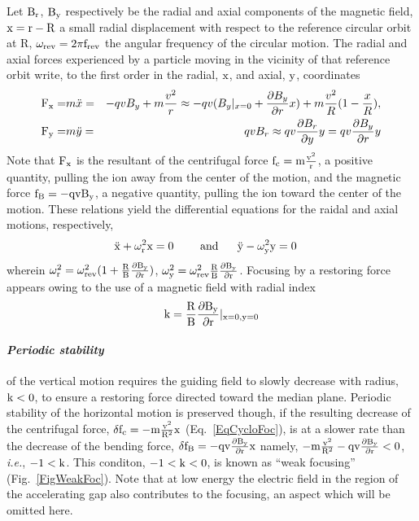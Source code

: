 Let $\rm B_r$, $\rm B_y$ respectively be the radial and axial components of the magnetic field, 
$\rm x=r-R$ a small radial displacement with respect to the reference circular orbit at R,  
$\rm \omega_{\rm rev} = 2\pi f_{\rm rev} $ the angular frequency of the circular motion. 
The radial and axial forces experienced by a particle moving in the vicinity of that reference orbit 
write, to the first order in the radial, $\rm x$,  and axial, $\rm y$, coordinates 
\begin{eqnarray}
\label{EqCycloFoc}
\rm
F_x = & m \ddot x=&  -qvB_y + m\frac{v^2}{r} \approx -q v (B_y|_{x=0} + \frac{\partial B_y}{\partial r}x)  + m\frac{v^2}{R}(1-\frac{x}{R}),   \nonumber \\ 
\rm 
F_y= & m\ddot y = &  qvB_r \approx q v \frac{\partial B_r}{\partial y} y = q v \frac{\partial B_y}{\partial r} y
\end{eqnarray}
Note that $\rm F_x$ is the resultant of the centrifugal force $\rm f_c=m\frac{v^2}{r}$, a positive quantity, pulling the ion 
away from the center of the motion, 
and the magnetic force $\rm f_B= -qvB_y$, a negative quantity, pulling the ion toward the center of the motion.
These relations yield the differential equations for the raidal and axial motions, respectively, 
\begin{eqnarray}
\label{EqCycloDiffEq}
\rm
  \ddot x + \omega_r^2 x=0 &  \ \ \ \ \ \ \ \rm and \ \ \ \ \
  \ddot{y} - \omega_y^2 y= 0  
\end{eqnarray}
wherein 
$\rm \omega_r^2 = \omega_{\rm rev}^2(1+\frac{R}{B}\frac{\partial B_y}{\partial r})$,  
$\rm  \omega_y^2 = \omega_{\rm rev}^2 \frac{R}{B} \frac{\partial B_y}{\partial r}$. 
Focusing by a restoring force appears owing to the use of a magnetic field with radial 
index 
\begin{equation} \rm
\label{EqCycloRadialIndex}
k = \frac{R}{B}\frac{\partial B_y}{\partial r}|_{x=0,y=0} 
\end{equation}


\paragraph{\sl Periodic stability\label{secCycloPerStab}}
of the vertical motion requires   the guiding field 
 to  slowly  decrease  with radius, $\rm k<0$, to ensure a restoring force directed toward the median plane. 
Periodic stability of the horizontal motion is preserved though, if the resulting decrease of the centrifugal force, 
$\rm \delta f_c= -m\frac{v^2}{R^2} x$  (Eq.~\ref{EqCycloFoc}),   
is at a slower rate than the decrease of the bending force, 
$\rm \delta f_B= - q v \frac{\partial B_y}{\partial r} x$
namely, 
$\rm -m\frac{v^2}{R^2}  - q v \frac{\partial B_y}{\partial r}<0$,  \textsl{i.e.}, $\rm -1<k$. 
This conditon,  $\rm -1 < k <0$, is known as ``weak focusing'' (Fig.~\ref{FigWeakFoc}). 
 Note that  at low energy  the electric field in the 
region of the accelerating gap also contributes to the focusing, an aspect which will be omitted here. 


